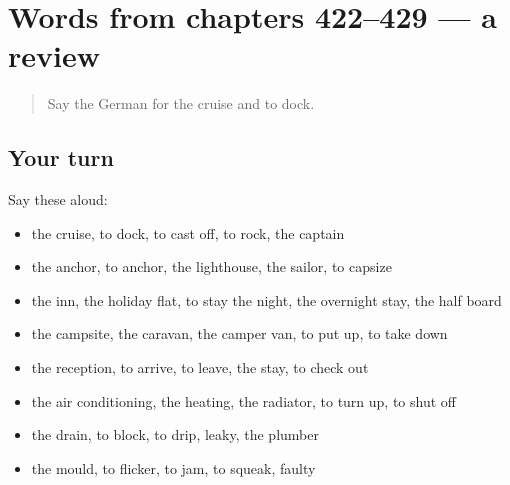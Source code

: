 \section[(dialogue)]{Words from chapters 422–429 — a review}

\label{lesson:GE-R429-review-422-429}



\begin{quote}
Say the German for the cruise and to dock.
\end{quote}

\subsection*{Your turn}
Say these aloud:

\begin{itemize}
\raggedright
  \item the cruise, to dock, to cast off, to rock, the captain
  \item the anchor, to anchor, the lighthouse, the sailor, to capsize
  \item the inn, the holiday flat, to stay the night, the overnight stay, the half board
  \item the campsite, the caravan, the camper van, to put up, to take down
  \item the reception, to arrive, to leave, the stay, to check out
  \item the air conditioning, the heating, the radiator, to turn up, to shut off
  \item the drain, to block, to drip, leaky, the plumber
  \item the mould, to flicker, to jam, to squeak, faulty
\end{itemize}

